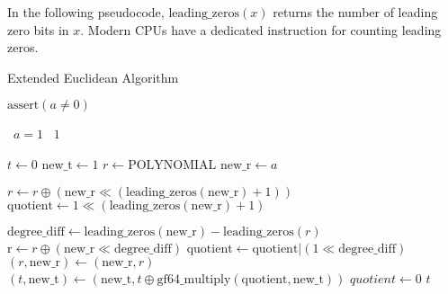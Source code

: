 In the following pseudocode, $\text{leading\_zeros}(x)$ returns the number of leading zero bits in $x$.
Modern CPUs have a dedicated instruction for counting leading zeros.

\begin{algorithm}
\caption{Extended Euclidean Algorithm}
\begin{algorithmic}

\State $\text{assert}(a \neq 0)$

\State \algorithmicif\ $a = 1$ \algorithmicthen\ \Return $1$ \algorithmicend \algorithmicif

\State $t \gets 0$
\State $\text{new\_t} \gets 1$
\State $r \gets \text{POLYNOMIAL}$
\State $\text{new\_r} \gets a$

\State $r \gets r \oplus (\text{new\_r} \ll (\text{leading\_zeros}(\text{new\_r}) + 1))$
\State $\text{quotient} \gets 1 \ll (\text{leading\_zeros}(\text{new\_r}) + 1)$

        \State $\text{degree\_diff} \gets \text{leading\_zeros}(\text{new\_r}) - \text{leading\_zeros}(r)$
        \State $\text{r} \gets r \oplus (\text{new\_r} \ll \text{degree\_diff})$
        \State $\text{quotient} \gets \text{quotient} | (1 \ll \text{degree\_diff})$
    \EndWhile
    \State $(r, \text{new\_r}) \gets (\text{new\_r}, r)$
    \State $(t, \text{new\_t}) \gets (\text{new\_t}, t \oplus \text{gf64\_multiply}(\text{quotient}, \text{new\_t}))$
    \State $quotient \gets 0$
\EndWhile
\State \Return $t$
\EndFunction
\end{algorithmic}
\end{algorithm}
